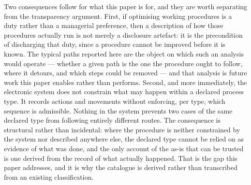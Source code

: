 Two consequences follow for what this paper is for, and they are worth separating from the
transparency argument. First, if optimising working procedures is a duty rather than a
managerial preference, then a description of how those procedures actually run is not merely a
disclosure artefact: it is the precondition of discharging that duty, since a procedure cannot
be improved before it is known. The typical paths reported here are the object on which such an
analysis would operate --- whether a given path is the one the procedure ought to follow, where
it detours, and which steps could be removed --- and that analysis is future work this paper
enables rather than performs. Second, and more immediately, the electronic system does not
constrain what may happen within a declared process type. It records actions and movements
without enforcing, per type, which sequence is admissible. Nothing in the system prevents two
cases of the same declared type from following entirely different routes. The consequence is
structural rather than incidental: where the procedure is neither constrained by the system nor
described anywhere else, the declared type cannot be relied on as evidence of what was done, and
the only account of the as-is that can be trusted is one derived from the record of what actually
happened. That is the gap this paper addresses, and it is why the catalogue is derived rather
than transcribed from an existing classification.
